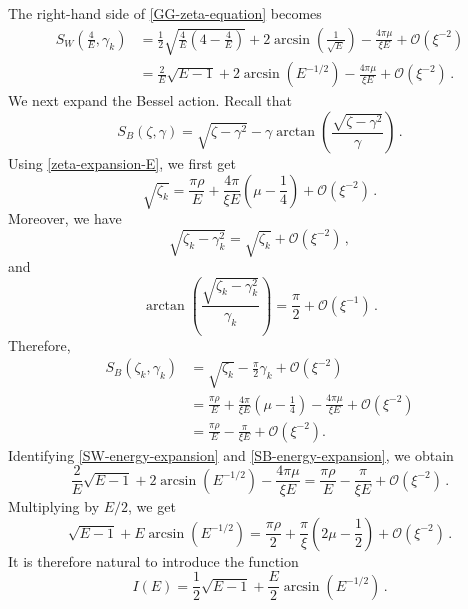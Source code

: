 \documentclass[11pt]{amsart}
\numberwithin{equation}{section}
\theoremstyle{remark}
\newcommand{\mn}{\medskip\noindent}
\newcommand{\action}{I}
\begin{document}
\mn 
The right-hand side of
\eqref{GG-zeta-equation} becomes
\begin{equation}\label{SW-energy-expansion}
\begin{aligned}
S_W\left(\frac4E,\gamma_k\right)
&=
\frac12\sqrt{\frac4E\left(4-\frac4E\right)}
+
2\arcsin\left(\frac1{\sqrt E}\right)
-
\frac{4\pi\mu}{\xi E}
+
\mathcal O(\xi^{-2})
\\
&=
\frac{2}{E}\sqrt{E-1}
+
2\arcsin(E^{-1/2})
-
\frac{4\pi\mu}{\xi E}
+
\mathcal O(\xi^{-2})\,.
\end{aligned}
\end{equation}
We next expand the Bessel action. Recall that
\[
S_B(\zeta,\gamma)
=
\sqrt{\zeta-\gamma^2}
-
\gamma\arctan
\left(
\frac{\sqrt{\zeta-\gamma^2}}{\gamma}
\right)\,.
\]
Using \eqref{zeta-expansion-E}, we first get
\begin{equation}\label{sqrt-zeta-expansion-E}
\sqrt{\zeta_k}
=
\frac{\pi\rho}{E}
+
\frac{4\pi}{\xi E}
\left(\mu-\frac14\right)
+
\mathcal O(\xi^{-2})\,.
\end{equation}
Moreover, 
we have
\[
\sqrt{\zeta_k-\gamma_k^2}
=
\sqrt{\zeta_k}
+
\mathcal O(\xi^{-2})\,,
\]
and
\[
\arctan
\left(
\frac{\sqrt{\zeta_k-\gamma_k^2}}{\gamma_k}
\right)
=
\frac{\pi}{2}
+
\mathcal O(\xi^{-1})\,.
\]
Therefore,
\begin{equation}\label{SB-energy-expansion}
\begin{aligned}
S_B(\zeta_k,\gamma_k)
&=
\sqrt{\zeta_k}
-
\frac{\pi}{2}\gamma_k
+
\mathcal O(\xi^{-2})
\\
&=
\frac{\pi\rho}{E}
+
\frac{4\pi}{\xi E}
\left(\mu-\frac14\right)
-
\frac{4\pi\mu}{\xi E}
+
\mathcal O(\xi^{-2})
\\
&=
\frac{\pi\rho}{E}
-
\frac{\pi}{\xi E}
+
\mathcal O(\xi^{-2}).
\end{aligned}
\end{equation}
Identifying \eqref{SW-energy-expansion} and
\eqref{SB-energy-expansion}, we obtain
\[
\frac{2}{E}\sqrt{E-1}
+
2\arcsin(E^{-1/2})
-
\frac{4\pi\mu}{\xi E}
=
\frac{\pi\rho}{E}
-
\frac{\pi}{\xi E}
+
\mathcal O(\xi^{-2})\,.
\]
Multiplying by \(E/2\), we get
\begin{equation}\label{pre-Phi}
\sqrt{E-1}
+
E\arcsin(E^{-1/2})
=
\frac{\pi\rho}{2}
+
\frac{\pi}{\xi}
\left(
2\mu-\frac12
\right)
+
\mathcal O(\xi^{-2})\,.
\end{equation}
It is therefore natural to introduce the function
\begin{equation}\label{Phi-def}
\action(E)
=
\frac12\sqrt{E-1}
+
\frac{E}{2}\arcsin(E^{-1/2})\,.
\end{equation}
\end{document}
